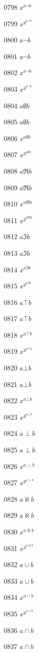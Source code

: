 \documentclass{article}
\begin{document}
0798 $x^{a\lnot b}$\par
0799 $x^{y^{a\lnot b}}$\par
0800 $a\neg b$\par
0801 $\displaystyle a\neg b$\par
0802 $x^{a\neg b}$\par
0803 $x^{y^{a\neg b}}$\par
0804 $a\emptyset b$\par
0805 $\displaystyle a\emptyset b$\par
0806 $x^{a\emptyset b}$\par
0807 $x^{y^{a\emptyset b}}$\par
0808 $a\Re b$\par
0809 $\displaystyle a\Re b$\par
0810 $x^{a\Re b}$\par
0811 $x^{y^{a\Re b}}$\par
0812 $a\Im b$\par
0813 $\displaystyle a\Im b$\par
0814 $x^{a\Im b}$\par
0815 $x^{y^{a\Im b}}$\par
0816 $a\top b$\par
0817 $\displaystyle a\top b$\par
0818 $x^{a\top b}$\par
0819 $x^{y^{a\top b}}$\par
0820 $a\bot b$\par
0821 $\displaystyle a\bot b$\par
0822 $x^{a\bot b}$\par
0823 $x^{y^{a\bot b}}$\par
0824 $a\perp b$\par
0825 $\displaystyle a\perp b$\par
0826 $x^{a\perp b}$\par
0827 $x^{y^{a\perp b}}$\par
0828 $a\aleph b$\par
0829 $\displaystyle a\aleph b$\par
0830 $x^{a\aleph b}$\par
0831 $x^{y^{a\aleph b}}$\par
0832 $a\cup b$\par
0833 $\displaystyle a\cup b$\par
0834 $x^{a\cup b}$\par
0835 $x^{y^{a\cup b}}$\par
0836 $a\cap b$\par
0837 $\displaystyle a\cap b$\par
\end{document}
